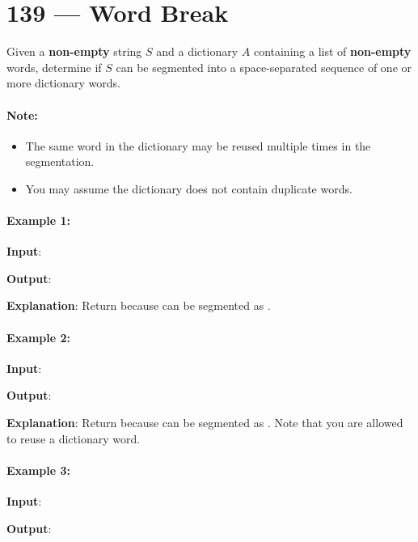 \section{139 --- Word Break}
Given a \textbf{non-empty} string $S$ and a dictionary $A$ containing a list of \textbf{non-empty} words, determine if $S$ can be segmented into a space-separated sequence of one or more dictionary words.
\par
\paragraph{Note:}
\begin{itemize}
\item The same word in the dictionary may be reused multiple times in the segmentation.
\item You may assume the dictionary does not contain duplicate words.
\end{itemize}
\paragraph{Example 1:}
\begin{flushleft}
\textbf{Input}:



\textbf{Output}: 

\textbf{Explanation}: Return  because  can be segmented as .
\end{flushleft}
\paragraph{Example 2:}
\begin{flushleft}
\textbf{Input}:



\textbf{Output}: 

\textbf{Explanation}: Return  because  can be segmented as . Note that you are allowed to reuse a dictionary word.
\end{flushleft}

\paragraph{Example 3:}
\begin{flushleft}
\textbf{Input}: 



\textbf{Output}: 

\end{flushleft}
